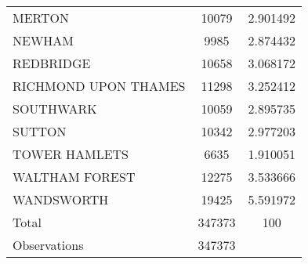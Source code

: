 {\begin{longtable}{l*{1}{cc}}
MERTON              &       10079&    2.901492\\
NEWHAM              &        9985&    2.874432\\
REDBRIDGE           &       10658&    3.068172\\
RICHMOND UPON THAMES&       11298&    3.252412\\
SOUTHWARK           &       10059&    2.895735\\
SUTTON              &       10342&    2.977203\\
TOWER HAMLETS       &        6635&    1.910051\\
WALTHAM FOREST      &       12275&    3.533666\\
WANDSWORTH          &       19425&    5.591972\\
Total               &      347373&         100\\
\midrule
Observations        &      347373&            \\
\bottomrule
\end{longtable}
\label{tab:summary_district}
}
